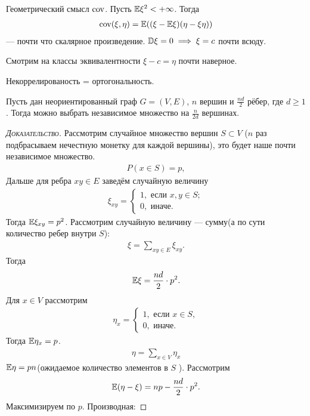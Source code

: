\documentclass[../main.tex]{subfiles}
\begin{document}
Геометрический смысл $\mathrm{cov}$. Пусть $ \mathbb E \xi^{2} < +\infty $. Тогда
\begin{align*}
 \mathrm{cov}(\xi,\eta) = \mathbb E((\xi - \mathbb E\xi)(\eta - \xi\eta))
\end{align*} --- почти что скалярное произведение. $ \mathbb D\xi = 0 \implies \xi = c $ почти всюду.

Смотрим на классы эквивалентности $ \xi - c = \eta$ почти наверное.

Некоррелированость = ортогональность.

\begin{exmpl}
 Пусть дан неориентированный граф $ G = (V,E) $, $ n $ вершин и $ \frac{nd}{2} $ рёбер, где $ d \geqslant 1 $. Тогда можно выбрать независимое множество на $ \frac{n}{2d} $ вершинах.
\end{exmpl}
\begin{proof}[\normalfont\textsc{Доказательство}]
 Рассмотрим случайное множество вершин $ S \subset V $ ($ n $ раз подбрасываем нечестную монетку для каждой вершины), это будет наше почти независимое множество.
 \begin{align*}
  P(x \in S) = p,
 \end{align*} Дальше для ребра $ xy \in E $ заведём случайную величину
 \begin{align*}
  \xi_{xy} = \begin{cases}
   1, \text{ если } x, y \in S; \\
   0, \text{ иначе. }
  \end{cases} 
 \end{align*} Тогда $ \mathbb E\xi_{xy} = p^{2} $. Рассмотрим случайную величину --- сумму(а по сути количество ребер внутри $S$):
 \begin{align*}
  \xi = \sum_{xy \in E}\xi_{xy}.
 \end{align*} Тогда
 \begin{align*}
  \mathbb E\xi = \frac{nd}{2} \cdot p^{2}
 .\end{align*} Для $ x \in V $ рассмотрим
 \begin{align*}
  \eta_x = \begin{cases}
   1, \text{ если } x \in S, \\
   0, \text{ иначе. }
  \end{cases} 
 \end{align*} Тогда $ \mathbb E\eta_x = p $.
 \begin{align*}
  \eta = \sum_{x \in V} \eta_x
 \end{align*} $ \mathbb E\eta = pn $(ожидаемое количество элементов в $S$ ). Рассмотрим
 \begin{align*}
  \mathbb E(\eta - \xi) = np - \frac{nd}{2} \cdot p^{2}.
 \end{align*} Максимизируем по $ p $. Производная:


\end{proof}
\end{document}
